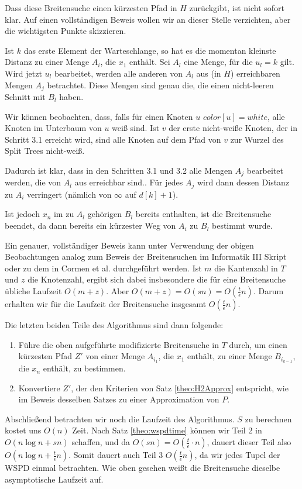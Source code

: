     Dass diese Breitensuche einen kürzesten Pfad in $H$ zurückgibt, ist nicht sofort klar. Auf einen vollständigen Beweis wollen wir an dieser Stelle verzichten, aber die wichtigsten Punkte skizzieren. 
    
    Ist $k$ das erste Element der Warteschlange, so hat es die momentan kleinste Distanz zu einer Menge $A_i$, die $x_1$ enthält. Sei $A_l$ eine Menge, für die $u_l = k$ gilt. Wird jetzt $u_l$ bearbeitet, werden alle anderen von $A_l$ aus (in $H$) erreichbaren Mengen $A_j$ betrachtet. Diese Mengen sind genau die, die einen nicht-leeren Schnitt mit $B_l$ haben. 
    
	Wir können beobachten, dass, falls für einen Knoten $u$ $color[u] = white$, alle Knoten im Unterbaum von $u$ weiß sind. Ist $v$ der erste nicht-weiße Knoten, der in Schritt 3.1 erreicht wird, sind alle Knoten auf dem Pfad von $v$ zur Wurzel des Split Trees nicht-weiß.
    
    Dadurch ist klar, dass in den Schritten 3.1 und 3.2 alle Mengen $A_j$ bearbeitet werden, die von $A_l$ aus erreichbar sind.. Für jedes $A_j$ wird dann dessen Distanz zu $A_i$ verringert (nämlich von $\infty$ auf $d[k]+1$). 
    
    Ist jedoch $x_n$ im zu $A_l$ gehörigen $B_l$ bereits enthalten, ist die Breitensuche beendet, da dann bereits ein kürzester Weg von $A_i$ zu $B_l$ bestimmt wurde.
    
    Ein genauer, vollständiger Beweis kann unter Verwendung der obigen Beobachtungen analog zum Beweis der Breitensuchen im Informatik III Skript \cite{hagerup} oder zu dem in Cormen et al. \cite{cormen} durchgeführt werden. Ist $m$ die Kantenzahl in $T$ und $z$ die Knotenzahl, ergibt sich dabei insbesondere die für eine Breitensuche übliche Laufzeit $O(m + z)$. Aber $O(m + z) = O(sn) = O(\frac{t}{\epsilon}n)$. Darum erhalten wir für die Laufzeit der Breitensuche insgesamt $O(\frac{t}{\epsilon}n)$.
    
    Die letzten beiden Teile des Algorithmus sind dann folgende:
    \begin{enumerate}[start=4, topsep=4mm]
    	\item Führe die oben aufgeführte modifizierte Breitensuche in $T$ durch, um einen kürzesten Pfad $Z'$ von einer Menge $A_{i_1}$, die $x_1$ enthält, zu einer Menge $B_{i_{k-1}}$, die $x_n$ enthält, zu bestimmen.
    	\item Konvertiere $Z'$, der den Kriterien von Satz \ref{theo:H2Approx} entspricht, wie im Beweis desselben Satzes zu einer Approximation von $P$.
    \end{enumerate}
    Abschließend betrachten wir noch die Laufzeit des Algorithmus. $S$ zu berechnen kostet uns $O(n)$ Zeit. Nach Satz \ref{theo:wspdtime} können wir Teil 2 in $O(n \log n + sn)$ schaffen, und da $O(sn) = O(\frac{t}{\epsilon}\cdot n)$, dauert dieser Teil also $O(n \log n + \frac{t}{\epsilon}n)$. Somit dauert auch Teil 3 $O(\frac{t}{\epsilon}n)$, da wir jedes Tupel der WSPD einmal betrachten. Wie oben gesehen weißt die Breitensuche dieselbe asymptotische Laufzeit auf. 
    

